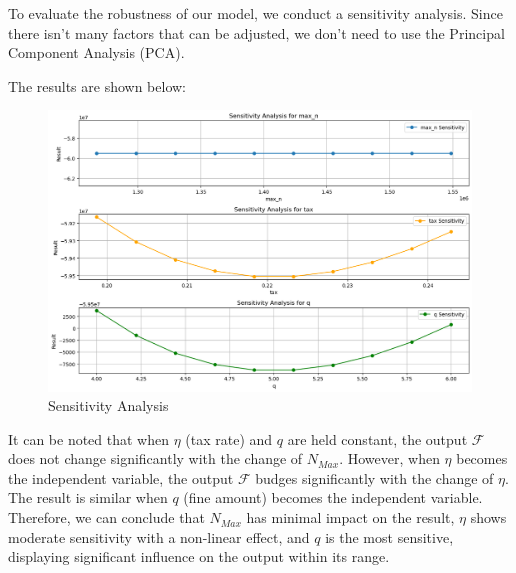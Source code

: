 To evaluate the robustness of our model, we conduct a sensitivity analysis.
Since there isn't many factors that can be adjusted, we don't need to use the Principal Component Analysis (PCA).

The results are shown below:

\begin{figure}[H]
    \centering
    \includegraphics[width=1\textwidth]{Sensitivity_Analysis.png} %
    \vspace{-0.5cm}
    \caption{Sensitivity Analysis}
\end{figure}

It can be noted that when $\eta$ (tax rate) and $q$ are held constant, 
the output $\mathcal{F}$ does not change significantly with the change of $N_{Max}$.
However, when $\eta$ becomes the independent variable, the output $\mathcal{F}$
budges significantly with the change of $\eta$. The result is similar when $q$ (fine amount) becomes the independent variable.
Therefore, we can conclude that $N_{Max}$ has minimal impact on the result, 
$\eta$ shows moderate sensitivity with a non-linear effect, 
and $q$ is the most sensitive, displaying significant influence on 
the output within its range.